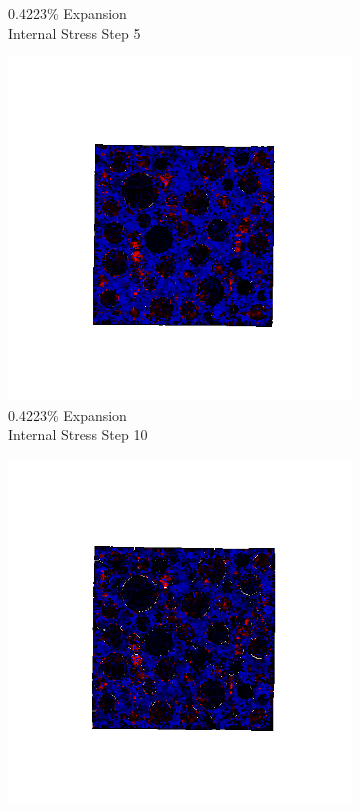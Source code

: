 \begin{figure}[h!]
\begin{subfigure}{.25\textwidth}
      \caption{0.4223\% Expansion\\Internal Stress Step 5}
    \end{subfigure}%
    \begin{subfigure}{.25\textwidth}
      \centering
      \includegraphics[width=1.0\linewidth]{Files/exp_3D/ASR/A30P75_3_s10.png}
      \caption{0.4223\% Expansion\\Internal Stress Step 10}
    \end{subfigure}%
    \begin{subfigure}{.25\textwidth}
      \centering
      \includegraphics[width=1.0\linewidth]{Files/exp_3D/ASR/A30P75_3_s15.png}

\end{subfigure}
\end{figure}

